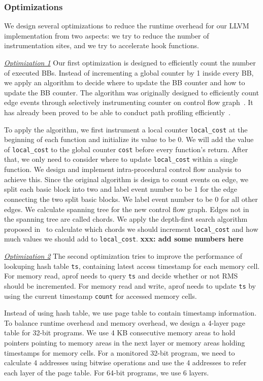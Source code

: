 \subsubsection{Optimizations}
We design several optimizations to reduce the 
runtime overhead for our LLVM implementation from two aspects:
we try to reduce the number of instrumentation sites, 
and we try to accelerate hook functions. 

{\underline{\textit{Optimization 1}}
Our first optimization is designed to efficiently count the number of executed BBs.
Instead of incrementing a global counter by 1 inside every BB,
we apply an algorithm to decide where to update the BB counter and how to update the BB counter. 
The algorithm was originally designed to 
efficiently count edge events through selectively instrumenting counter 
on control flow graph~\cite{event-counting}. 
It has already been proved to be able to conduct path 
profiling efficiently~\cite{peter-ase,path-profiling}.

To apply the algorithm, we first instrument a local counter 
\texttt{local\_cost} at the beginning of each function
and initialize its value to be 0. 
We will add the value of \texttt{local\_cost} to the 
global counter \texttt{cost} before 
every function's return.
After that, we only need to consider where to update \texttt{local\_cost} 
within a single function.
We design and implement intra-procedural 
control flow analysis to achieve this.
Since the original algorithm is design to count events on edge,
we split each basic block into two and label event number to be 1 
for the edge connecting the two split basic blocks.  
We label event number to be 0 for all other edges. 
We calculate spanning tree for the new control flow graph. 
Edges not in the spanning tree are called chords.
We apply the depth-first search algorithm proposed in~\cite{event-counting} 
to calculate which chords we should increment 
\texttt{local\_cost} and how much values 
we should add to \texttt{local\_cost}.
{\bf xxx: add some numbers here}


{\underline{\textit{Optimization 2}}
The second optimization tries to improve the performance of 
lookuping hash table \texttt{ts}, 
containing latest access timestamp for each memory cell.
For memory read, 
aprof needs to query \texttt{ts} and decide 
whether or not RMS should be incremented.
For memory read and write, 
aprof needs to update \texttt{ts} by using the current timestamp \texttt{count}
for accessed memory cells. 

Instead of using hash table, 
we use page table to contain timestamp information. 
To balance runtime overhead and memory overhead, 
we design a 4-layer page table for 32-bit programs.
We use 4 KB consecutive memory areas to hold pointers pointing to 
memory areas in the next layer 
or memory areas holding timestamps for memory cells. 
For a monitored 32-bit program, 
we need to calculate 4 addresses using bitwise operations 
and use the 4 addresses to refer each layer of the page table.  
For 64-bit programs, we use 6 layers.  


}}
